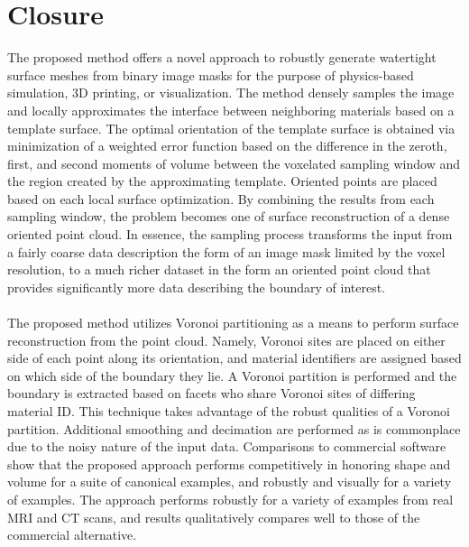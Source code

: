 \section{Closure}

The proposed method offers a novel approach to robustly generate watertight surface meshes from binary image masks for the purpose of physics-based simulation, 3D printing, or visualization. The method densely samples the image and locally approximates the interface between neighboring materials based on a template surface. The optimal orientation of the template surface is obtained via minimization of a weighted error function based on the difference in the zeroth, first, and second moments of volume between the voxelated sampling window and the region created by the approximating template. Oriented points are placed based on each local surface optimization. By combining the results from each sampling window, the problem becomes one of surface reconstruction of a dense oriented point cloud. In essence, the sampling process transforms the input from a fairly coarse data description the form of an image mask limited by the voxel resolution, to a much richer dataset in the form an oriented point cloud that provides significantly more data describing the boundary of interest. \\ \\
%
The proposed method utilizes Voronoi partitioning as a means to perform surface reconstruction from the point cloud. Namely, Voronoi sites are placed on either side of each point along its orientation, and material identifiers are assigned based on which side of the boundary they lie. A Voronoi partition is performed and the boundary is extracted based on facets who share Voronoi sites of differing material ID. This technique takes advantage of the robust qualities of a Voronoi partition. Additional smoothing and decimation are performed as is commonplace due to the noisy nature of the input data. Comparisons to commercial software show that the proposed approach performs competitively in honoring shape and volume for a suite of canonical examples, and robustly and visually for a variety of examples. The approach performs robustly for a variety of examples from real MRI and CT scans, and results qualitatively compares well to those of the commercial alternative. \\ \\
%
